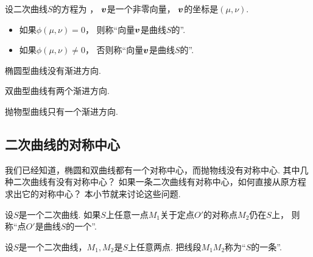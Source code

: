 \begin{definition}
设二次曲线\(S\)的方程为 ，
\(\boldsymbol{v}\)是一个非零向量，
\(\boldsymbol{v}\)的坐标是\((\mu,\nu)\).
\begin{itemize}
	\item 如果\(\phi(\mu,\nu) = 0\)，
	则称“向量\(\boldsymbol{v}\)是曲线\(S\)的”.

	\item 如果\(\phi(\mu,\nu) \neq 0\)，
	否则称“向量\(\boldsymbol{v}\)是曲线\(S\)的”.
\end{itemize}
\end{definition}

\begin{theorem}
椭圆型曲线没有渐进方向.
\end{theorem}

\begin{theorem}
双曲型曲线有两个渐进方向.
\end{theorem}

\begin{theorem}
抛物型曲线只有一个渐进方向.
\end{theorem}

\subsection{二次曲线的对称中心}
我们已经知道，椭圆和双曲线都有一个对称中心，而抛物线没有对称中心.
其中几种二次曲线有没有对称中心？
如果一条二次曲线有对称中心，如何直接从原方程求出它的对称中心？
本小节就来讨论这些问题.

\begin{definition}
设\(S\)是一个二次曲线.
如果\(S\)上任意一点\(M_1\)关于定点\(O'\)的对称点\(M_2\)仍在\(S\)上，
则称“点\(O'\)是曲线\(S\)的一个”.
\end{definition}

\begin{definition}
设\(S\)是一个二次曲线，\(M_1,M_2\)是\(S\)上任意两点.
把线段\(M_1 M_2\)称为“\(S\)的一条”.
\end{definition}

